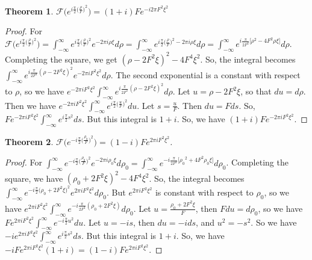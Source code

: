 \documentclass{article}
\theoremstyle{mystyle}
\newtheorem{theorem}{Theorem}[section]
\begin{document}
\begin{theorem}
$\mathcal{F}\big(e^{i\frac{\pi}{2}\big(\frac{\rho}{F}\big)^2}\big) = (1+i)Fe^{-i2\pi F^2 \xi^2}$
\end{theorem}
\begin{proof}
For $\mathcal{F}\big(e^{i\frac{\pi}{2} \big(\frac{\rho}{F}\big)^2}\big) = \int_{-\infty}^{\infty} e^{i\frac{\pi}{2}\big(\frac{\rho}{F}\big)^2}e^{-2\pi i \rho \xi}d\rho = \int_{-\infty}^{\infty} e^{i\frac{\pi}{2}\big(\frac{\rho}{F}\big)^2-2\pi i \rho \xi}d\rho = \int_{-\infty}^{\infty} e^{i\frac{\pi}{2F^2}\big[\rho^2-4F^2\rho \xi\big]}d\rho$. Completing the square, we get $(\rho - 2F^2 \xi)^2 - 4F^4\xi^2$. So, the integral becomes $\int_{-\infty}^{\infty} e^{i\frac{\pi}{2F^2}(\rho - 2F^2\xi)^2}e^{-2\pi i F^2 \xi^2}d\rho$. The second exponential is a constant with respect to $\rho$, so we have $e^{-2\pi i F^2 \xi^2}\int_{-\infty}^{\infty} e^{i\frac{\pi}{2F^2}(\rho - 2F^2\xi)^2}d\rho$. Let $u = \rho - 2F^2\xi$, so that $du = d\rho$. Then we have $e^{-2\pi i F^2 \xi^2}\int_{-\infty}^{\infty} e^{i\frac{\pi}{2}\big(\frac{u}{F}\big)^2}du$. Let $s = \frac{u}{F}$. Then $du = Fds$. So, $Fe^{-2\pi i F^2 \xi^2} \int_{-\infty}^{\infty} e^{i\frac{\pi}{2}s^2}ds$. But this integral is $1+i$. So, we have $(1+i)Fe^{-2\pi i F^2 \xi^2}$.
\end{proof}

\begin{theorem}
$\mathcal{F}(e^{-i\frac{\pi}{2}\big(\frac{\rho_0}{F}\big)^2}\big) = (1-i)Fe^{2\pi i F^2 \xi^2}$.
\end{theorem}
\begin{proof}
For $\int_{-\infty}^{\infty} e^{-i\frac{\pi}{2}\big(\frac{\rho_0}{F}\big)^2}e^{-2\pi i \rho_0 \xi}d\rho_0 = \int_{-\infty}^{\infty} e^{-i\frac{\pi}{2F^2}\big[{\rho_0}^2 + 4F^2 \rho_0 \xi\big]}d\rho_0$. Completing the square, we have $(\rho_0+2F^2\xi)^2 - 4F^4\xi^2$. So, the integral becomes $\int_{-\infty}^{\infty} e^{-i\frac{\pi}{2}\big(\rho_0+2F^2\xi\big)^2}e^{2\pi i F^2 \xi^2}d\rho_0$. But $e^{2\pi i F^2 \xi^2}$ is constant with respect to $\rho_0$, so we have $e^{2\pi i F^2 \xi^2} \int_{-\infty}^{\infty} e^{-i\frac{\pi}{2F^2}(\rho_0+2F^2\xi)}d\rho_0$. Let $u = \frac{\rho_0 + 2F^2 \xi}{F}$, then $Fdu = d\rho_0$, so we have $Fe^{2\pi i F^2 \xi^2} \int_{-\infty}^{\infty} e^{-i\frac{\pi}{2}u^2}du$. Let $u = -is$, then $du = -ids$, and $u^2 = -s^2$. So we have $-i e^{2\pi i F^2 \xi^2}\int_{-\infty}^{\infty} e^{i\frac{\pi}{2}s^2}ds$. But this integral is $1+i$. So, we have $-iFe^{2\pi i F^2 \xi^2}(1+i) = (1-i)Fe^{2\pi i F^2 \xi^2}$.
\end{proof} 
\end{document}
